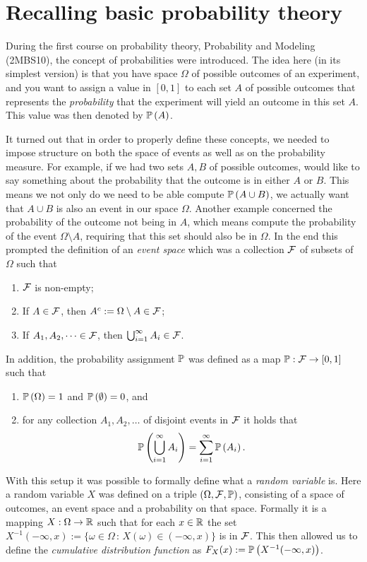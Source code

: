 
\section{Recalling basic probability theory}

During the first course on probability theory, Probability and Modeling (2MBS10), the concept of probabilities were introduced. The idea here (in its simplest version) is that you have space $\Omega$ of possible outcomes of an experiment, and you want to assign a value in $[0,1]$ to each set $A$ of possible outcomes that represents the \emph{probability} that the experiment will yield an outcome in this set $A$. This value was then denoted by $\mathbb P\left(A\right)$. 

It turned out that in order to properly define these concepts, we needed to impose structure on both the space of events as well as on the probability measure. For example, if we had two sets $A, B$ of possible outcomes, would like to say something about the probability that the outcome is in either $A$ or $B$. This means we not only do we need to be able compute $\mathbb P\left(A \cup B\right)$, we actually want that $A \cup B$ is also an event in our space $\Omega$. Another example concerned the probability of the outcome not being in $A$, which means compute the probability of the event $\Omega\setminus A$, requiring that this set should also be in $\Omega$. In the end this prompted the definition of an \emph{event space} which was a collection $\mathcal F$ of subsets of $\Omega$ such that
\begin{enumerate}
\item $\mathcal F$ is non-empty;
\item If $A \in \mathcal F$, then $A^c := \Omega \setminus A \in \mathcal F$;
\item If $A_1, A_2, \dots \in \mathcal F$, then $\bigcup_{i = 1}^\infty A_i \in \mathcal F$.
\end{enumerate}

In addition, the probability assignment $\mathbb P$ was defined as a map $\mathbb P : \mathcal F \to [0,1]$ such that
\begin{enumerate}
\item $\mathbb P\left(\Omega\right) = 1$ and $\mathbb P\left(\emptyset\right) = 0$, and
\item for any collection $A_1, A_2, \dots$ of disjoint events in $\mathcal F$ it holds that 
\[
	\mathbb P\left(\bigcup_{i = 1}^\infty A_i\right) = \sum_{i = 1}^\infty \mathbb P\left(A_i\right).
\]
\end{enumerate}

With this setup it was possible to formally define what a \emph{random variable} is. Here a random variable $X$ was defined on a triple $(\Omega, \mathcal F, \mathbb P)$, consisting of a space of outcomes, an event space and a probability on that space. Formally it is a mapping $X : \Omega \to \mathbb R$ such that for each $x \in \mathbb R$ the set $X^{-1}(-\infty,x):=\{\omega \in \Omega \, : \, X(\omega) \in (-\infty,x)\}$ is in $\mathcal F$. This then allowed us to define the \emph{cumulative distribution function} as $F_X(x) := \mathbb P\left(X^{-1}(-\infty,x)\right)$.

